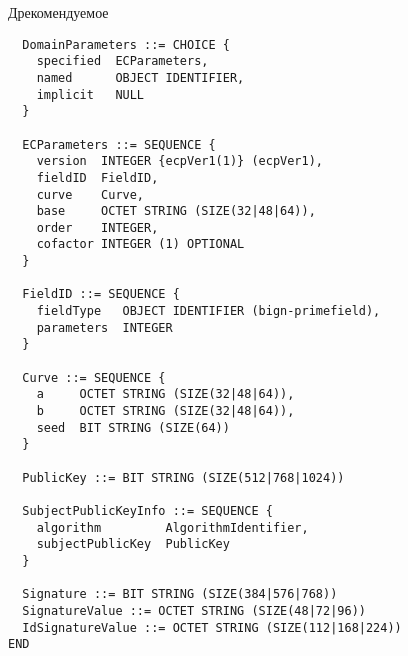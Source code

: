 \begin{appendix}{Д}{рекомендуемое}
\begin{verbatim}
  DomainParameters ::= CHOICE {
    specified  ECParameters,
    named      OBJECT IDENTIFIER,
    implicit   NULL
  }

  ECParameters ::= SEQUENCE {
    version  INTEGER {ecpVer1(1)} (ecpVer1),
    fieldID  FieldID,
    curve    Curve,
    base     OCTET STRING (SIZE(32|48|64)),
    order    INTEGER,
    cofactor INTEGER (1) OPTIONAL
  }

  FieldID ::= SEQUENCE {
    fieldType   OBJECT IDENTIFIER (bign-primefield),
    parameters  INTEGER
  } 

  Curve ::= SEQUENCE {
    a     OCTET STRING (SIZE(32|48|64)),
    b     OCTET STRING (SIZE(32|48|64)),
    seed  BIT STRING (SIZE(64))
  }

  PublicKey ::= BIT STRING (SIZE(512|768|1024))

  SubjectPublicKeyInfo ::= SEQUENCE {
    algorithm         AlgorithmIdentifier,
    subjectPublicKey  PublicKey
  }

  Signature ::= BIT STRING (SIZE(384|576|768))
  SignatureValue ::= OCTET STRING (SIZE(48|72|96))
  IdSignatureValue ::= OCTET STRING (SIZE(112|168|224))
END             
\end{verbatim}
\end{appendix}
